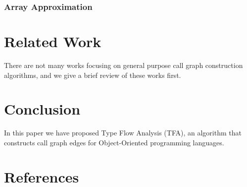 \documentclass[review]{elsarticle}
\begin{document}
\subsubsection{Array Approximation}\label{subsubsec:array-approximation}

\section{Related Work}\label{sec:related-work}
There are not many works focusing on general purpose call graph construction algorithms, and we give a brief review of these works first.

\section{Conclusion}\label{sec:conclusion}
In this paper we have proposed Type Flow Analysis (TFA), an algorithm that constructs call graph edges for Object-Oriented programming languages.

\section*{References}


\end{document}
